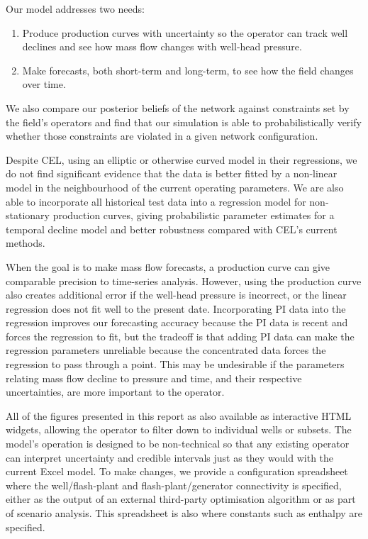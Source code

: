 \documentclass[a4paper, 12pt]{article}
\begin{document}
Our model addresses two needs:
\begin{enumerate}
\item Produce production curves with uncertainty so the operator can track well declines and see how mass flow changes with well-head pressure.
\item Make forecasts, both short-term and long-term, to see how the field changes over time.
\end{enumerate}
We also compare our posterior beliefs of the network against constraints set by the field's operators and find that our simulation is able to probabilistically verify whether those constraints are violated in a given network configuration.

Despite CEL, \citet{Grant:2011} using an elliptic or otherwise curved model in their regressions, we do not find significant evidence that the data is better fitted by a non-linear model in the neighbourhood of the current operating parameters. We are also able to incorporate all historical test data into a regression model for non-stationary production curves, giving probabilistic parameter estimates for a temporal decline model and better robustness compared with CEL's current methods.

When the goal is to make mass flow forecasts, a production curve can give comparable precision to time-series analysis. However, using the production curve also creates additional error if the well-head pressure is incorrect, or the linear regression does not fit well to the present date. Incorporating PI data into the regression improves our forecasting accuracy because the PI data is recent and forces the regression to fit, but the tradeoff is that adding PI data can make the regression parameters unreliable because the concentrated data forces the regression to pass through a point. This may be undesirable if the parameters relating mass flow decline to pressure and time, and their respective uncertainties, are more important to the operator.

All of the figures presented in this report as also available as interactive HTML widgets, allowing the operator to filter down to individual wells or subsets. The model's operation is designed to be non-technical so that any existing operator can interpret uncertainty and credible intervals just as they would with the current Excel model. To make changes, we provide a configuration spreadsheet where the well/flash-plant and flash-plant/generator connectivity is specified, either as the output of an external third-party optimisation algorithm \citep{Fox:2018} or as part of scenario analysis. This spreadsheet is also where constants such as enthalpy are specified.
\end{document}
